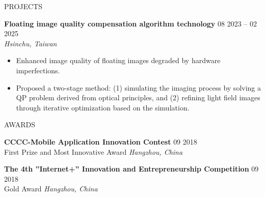 \documentclass{resume}
\begin{document}
\begin{rSection}{PROJECTS}

    \item \textbf{Floating image quality compensation algorithm technology} \hfill {08 2023 -- 02 2025}\\
    \mbox{} \hfill \textit{Hsinchu, Taiwan}
    \begin{itemize}
        \item Enhanced image quality of floating images degraded by hardware imperfections.
        \item Proposed a two-stage method: (1) simulating the imaging process by solving a QP problem derived from optical principles, and (2) refining light field images through iterative optimization based on the simulation.
    \end{itemize}
\end{rSection} 

\vspace{-1em}
\begin{rSection}{AWARDS}
\vspace{-1.25em}
    \item \textbf{CCCC-Mobile Application Innovation Contest} \hfill {09 2018}\\
    {First Prize and Most Innovative Award} \hfill \textit{Hangzhou, China}

    \item \textbf{The 4th ”Internet+” Innovation and Entrepreneurship Competition} \hfill {09 2018}\\
    {Gold Award} \hfill \textit{Hangzhou, China}

\end{rSection} 
\end{document}
